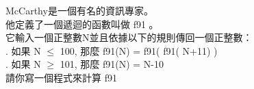 McCarthy是一個有名的資訊專家。\\
他定義了一個遞迴的函數叫做 f91 。\\
它輸入一個正整數N並且依據以下的規則傳回一個正整數：\\
. 如果 N $\leq$ 100, 那麼 f91(N) = f91( f91( N+11) )\\
. 如果 N $\geq$ 101, 那麼 f91(N) = N-10\\
請你寫一個程式來計算 f91